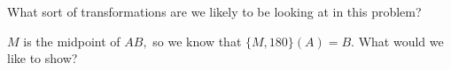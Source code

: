 What sort of transformations are we likely to be looking at in this problem?







$M$ is the midpoint of $AB,$ so we know that $\{M,180\} (A) = B.$  What would we like to show?















